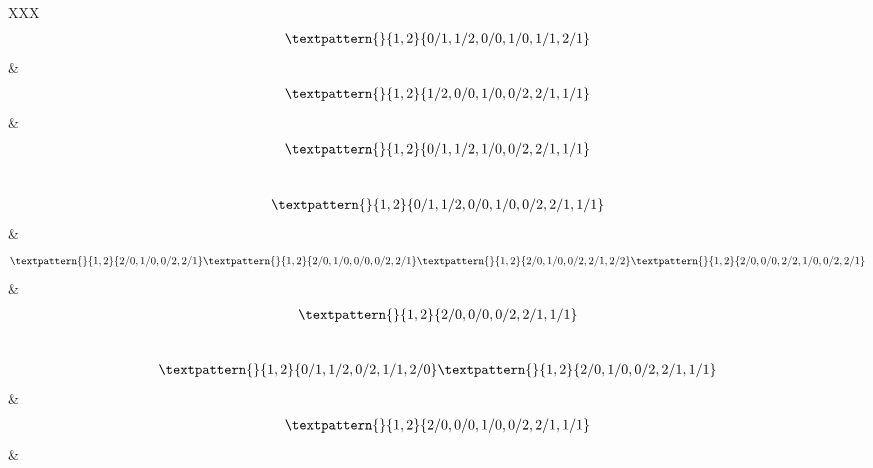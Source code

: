 \begin{center}
\begin{longtabu}[l]{XXX}
\begin{equation}
	\begin{gathered}
		\textpattern{}{1,2}{0/1,1/2,0/0,1/0,1/1,2/1}
	\end{gathered}
	\label{cls:61}
\end{equation}
&
\begin{equation}
	\begin{gathered}
		\textpattern{}{1,2}{1/2,0/0,1/0,0/2,2/1,1/1}
	\end{gathered}
	\label{cls:62}
\end{equation}
&
\begin{equation}
	\begin{gathered}
		\textpattern{}{1,2}{0/1,1/2,1/0,0/2,2/1,1/1}
	\end{gathered}
	\label{cls:63}
\end{equation}\\
\begin{equation}
	\begin{gathered}
		\textpattern{}{1,2}{0/1,1/2,0/0,1/0,0/2,2/1,1/1}
	\end{gathered}
	\label{cls:64}
\end{equation}
&
\begin{equation}
	\begin{gathered}
		\textpattern{}{1,2}{2/0,1/0,0/2,2/1}
		\textpattern{}{1,2}{2/0,1/0,0/0,0/2,2/1}
		\textpattern{}{1,2}{2/0,1/0,0/2,2/1,2/2}
		\textpattern{}{1,2}{2/0,0/0,2/2,1/0,0/2,2/1}
	\end{gathered}
	\label{cls:65}
\end{equation}
&
\begin{equation}
	\begin{gathered}
		\textpattern{}{1,2}{2/0,0/0,0/2,2/1,1/1}
	\end{gathered}
	\label{cls:66}
\end{equation}
\\
\begin{equation}
	\begin{gathered}
		\textpattern{}{1,2}{0/1,1/2,0/2,1/1,2/0}
		\textpattern{}{1,2}{2/0,1/0,0/2,2/1,1/1}
	\end{gathered}
	\label{cls:67}
\end{equation}
    &
\begin{equation}
	\begin{gathered}
		\textpattern{}{1,2}{2/0,0/0,1/0,0/2,2/1,1/1}
	\end{gathered}
	\label{cls:68}
\end{equation}
    &
\begin{equation}

\end{equation}
\end{longtabu}
\end{center}

